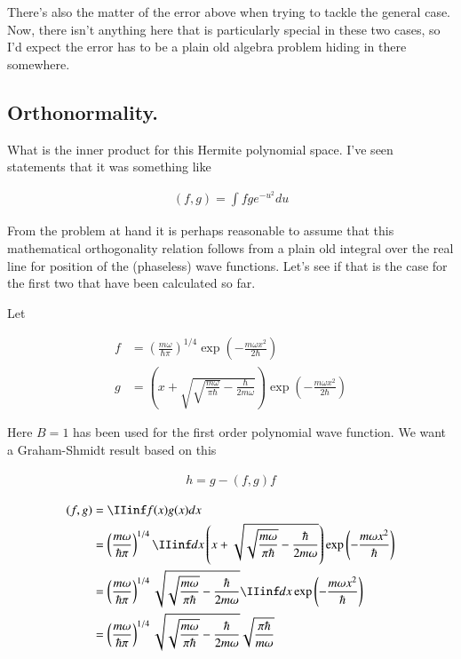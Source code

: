 There's also the matter of the error above when trying to tackle the general case.  Now, there isn't anything here that is particularly special in these two
cases, so I'd expect the error has to be a plain old algebra problem 
hiding in there somewhere.

\subsection{Orthonormality. }

What is the inner product for this Hermite polynomial space.  I've seen statements that it was something like

\begin{align*}
(f,g) = \int f g e^{-u^2} du
\end{align*}

From the problem at hand it is perhaps reasonable to assume that this 
mathematical orthogonality relation follows from a plain old integral over
the real line for position of the (phaseless) wave functions.  Let's see
if that is the case for the first two that have been calculated so far.

Let

\begin{align*}
f &= 
\left( 
\frac{ m \omega }{\hbar \pi}
\right)^{1/4} \exp\left( - \frac{m \omega x^2 }{2 \hbar} \right) \\
g &=
\left(x + \sqrt{\sqrt{\frac{m \omega}{\pi \hbar}} - \frac{ \hbar}{ 2 m \omega} }\right) \exp\left( - \frac{m \omega x^2}{2 \hbar} \right)
\end{align*}

Here $B=1$ has been used for the first order polynomial wave function.  We want a Graham-Shmidt result based on this

\begin{align*}
h = g - (f,g) f
\end{align*}

\begin{align*}
(f,g)
&= \IIinf f(x) g(x) dx \\
&= 
\left( 
\frac{ m \omega }{\hbar \pi}
\right)^{1/4} 
\IIinf dx
\left(x + \sqrt{\sqrt{\frac{m \omega}{\pi \hbar}} - \frac{ \hbar}{ 2 m \omega} }\right) 
\exp\left( - \frac{m \omega x^2 }{\hbar} \right) \\
&= 
\left( 
\frac{ m \omega }{\hbar \pi}
\right)^{1/4} 
\sqrt{\sqrt{\frac{m \omega}{\pi \hbar}} - \frac{ \hbar}{ 2 m \omega} }
\IIinf dx
\exp\left( - \frac{m \omega x^2 }{\hbar} \right) \\
&= 
\left( 
\frac{ m \omega }{\hbar \pi}
\right)^{1/4} 
\sqrt{\sqrt{\frac{m \omega}{\pi \hbar}} - \frac{ \hbar}{ 2 m \omega} }
\sqrt{ \frac{\pi \hbar}{ m \omega} }
\end{align*}

